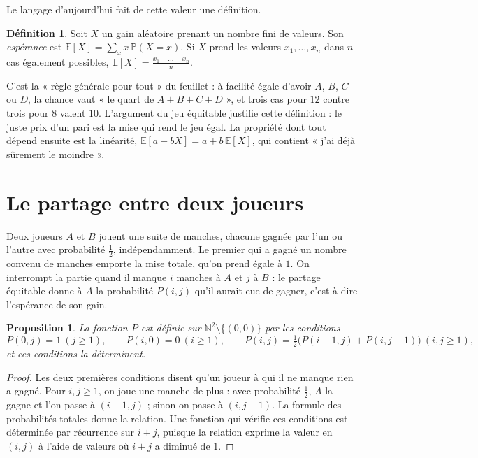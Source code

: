 \documentclass[11pt,a4paper]{article}
\theoremstyle{plain}
\newtheorem{proposition}[theoreme]{Proposition}
\theoremstyle{definition}
\newtheorem{definition}[theoreme]{Définition}
\theoremstyle{remark}
\newcommand{\N}{\mathbb{N}}
\newcommand{\Prob}{\mathbb{P}}
\newcommand{\E}{\mathbb{E}}
\begin{document}
Le langage d'aujourd'hui fait de cette valeur une définition.

\begin{definition}
Soit $X$ un gain aléatoire prenant un nombre fini de valeurs. Son \emph{espérance} est $\E[X]=\sum_xx\,\Prob(X=x)$. Si $X$ prend les valeurs $x_1,\dots,x_n$ dans $n$ cas également possibles, $\E[X]=\frac{x_1+\dots+x_n}n$.
\end{definition}

C'est la « règle générale pour tout » du feuillet : à facilité égale d'avoir $A$, $B$, $C$ ou $D$, la chance vaut « le quart de $A+B+C+D$ », et trois cas pour $12$ contre trois pour $8$ valent $10$. L'argument du jeu équitable justifie cette définition : le juste prix d'un pari est la mise qui rend le jeu égal. La propriété dont tout dépend ensuite est la linéarité, $\E[a+bX]=a+b\,\E[X]$, qui contient « j'ai déjà sûrement le moindre ».

\section{Le partage entre deux joueurs}

Deux joueurs $A$ et $B$ jouent une suite de manches, chacune gagnée par l'un ou l'autre avec probabilité $\frac12$, indépendamment. Le premier qui a gagné un nombre convenu de manches emporte la mise totale, qu'on prend égale à $1$. On interrompt la partie quand il manque $i$ manches à $A$ et $j$ à $B$ : le partage équitable donne à $A$ la probabilité $P(i,j)$ qu'il aurait eue de gagner, c'est-à-dire l'espérance de son gain.

\begin{proposition}\label{prop:recurrence}
La fonction $P$ est définie sur $\N^2\setminus\{(0,0)\}$ par les conditions
\[
  P(0,j)=1\ (j\geq1),\qquad P(i,0)=0\ (i\geq1),\qquad P(i,j)=\tfrac12\big(P(i-1,j)+P(i,j-1)\big)\ (i,j\geq1),
\]
et ces conditions la déterminent.
\end{proposition}

\begin{proof}
Les deux premières conditions disent qu'un joueur à qui il ne manque rien a gagné. Pour $i,j\geq1$, on joue une manche de plus : avec probabilité $\frac12$, $A$ la gagne et l'on passe à $(i-1,j)$ ; sinon on passe à $(i,j-1)$. La formule des probabilités totales donne la relation. Une fonction qui vérifie ces conditions est déterminée par récurrence sur $i+j$, puisque la relation exprime la valeur en $(i,j)$ à l'aide de valeurs où $i+j$ a diminué de $1$.
\end{proof}
\end{document}
